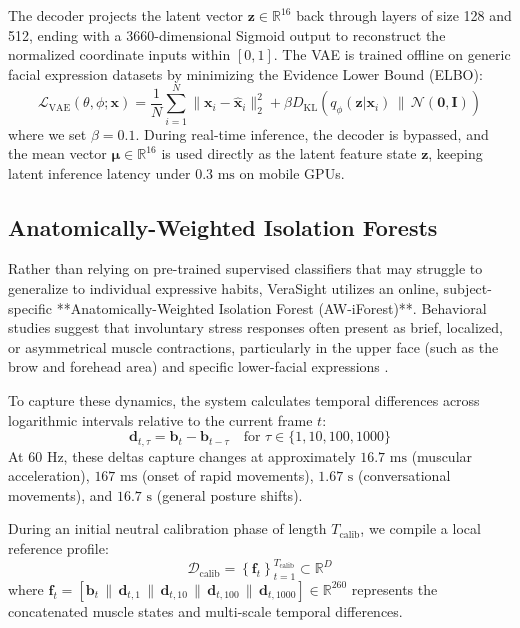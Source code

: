 \documentclass[sigconf]{acmart}
\begin{document}
The decoder projects the latent vector $\mathbf{z} \in \mathbb{R}^{16}$ back through layers of size 128 and 512, ending with a 3660-dimensional Sigmoid output to reconstruct the normalized coordinate inputs within $[0, 1]$. The VAE is trained offline on generic facial expression datasets by minimizing the Evidence Lower Bound (ELBO):
$$\mathcal{L}_{\text{VAE}}(\theta, \phi; \mathbf{x}) = \frac{1}{N} \sum_{i=1}^{N} \|\mathbf{x}_i - \hat{\mathbf{x}}_i\|^2_2 + \beta D_{\text{KL}}\left( q_\phi(\mathbf{z}|\mathbf{x}_i) \,\parallel\, \mathcal{N}(\mathbf{0}, \mathbf{I}) \right)$$
where we set $\beta = 0.1$. During real-time inference, the decoder is bypassed, and the mean vector $\boldsymbol{\mu} \in \mathbb{R}^{16}$ is used directly as the latent feature state $\mathbf{z}$, keeping latent inference latency under $0.3\text{ ms}$ on mobile GPUs.

\subsection{Anatomically-Weighted Isolation Forests}
Rather than relying on pre-trained supervised classifiers that may struggle to generalize to individual expressive habits, VeraSight utilizes an online, subject-specific **Anatomically-Weighted Isolation Forest (AW-iForest)**. Behavioral studies suggest that involuntary stress responses often present as brief, localized, or asymmetrical muscle contractions, particularly in the upper face (such as the brow and forehead area) and specific lower-facial expressions \cite{porter2012secrets, vitale2021facial}.

To capture these dynamics, the system calculates temporal differences across logarithmic intervals relative to the current frame $t$:
$$\mathbf{d}_{t, \tau} = \mathbf{b}_t - \mathbf{b}_{t-\tau} \quad \text{for } \tau \in \{1, 10, 100, 1000\}$$
At 60 Hz, these deltas capture changes at approximately $16.7\text{ ms}$ (muscular acceleration), $167\text{ ms}$ (onset of rapid movements), $1.67\text{ s}$ (conversational movements), and $16.7\text{ s}$ (general posture shifts).

During an initial neutral calibration phase of length $T_{\text{calib}}$, we compile a local reference profile:
$$\mathcal{D}_{\text{calib}} = \left\{ \mathbf{f}_t \right\}_{t=1}^{T_{\text{calib}}} \subset \mathbb{R}^D$$
where $\mathbf{f}_t = [\mathbf{b}_t \,\|\, \mathbf{d}_{t, 1} \,\|\, \mathbf{d}_{t, 10} \,\|\, \mathbf{d}_{t, 100} \,\|\, \mathbf{d}_{t, 1000}] \in \mathbb{R}^{260}$ represents the concatenated muscle states and multi-scale temporal differences.
\end{document}
